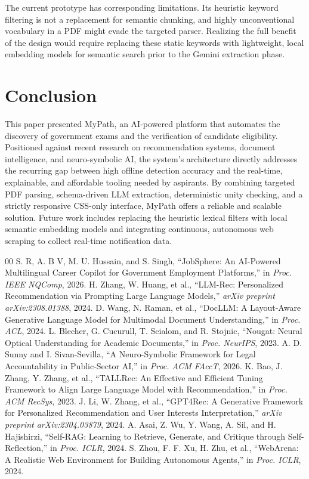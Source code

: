 \documentclass[conference]{IEEEtran}
\begin{document}
The current prototype has corresponding limitations. Its heuristic keyword filtering is not a replacement for semantic chunking, and highly unconventional vocabulary in a PDF might evade the targeted parser. Realizing the full benefit of the design would require replacing these static keywords with lightweight, local embedding models for semantic search prior to the Gemini extraction phase.

\section{Conclusion}

This paper presented MyPath, an AI-powered platform that automates the discovery of government exams and the verification of candidate eligibility. Positioned against recent research on recommendation systems, document intelligence, and neuro-symbolic AI, the system's architecture directly addresses the recurring gap between high offline detection accuracy and the real-time, explainable, and affordable tooling needed by aspirants. By combining targeted PDF parsing, schema-driven LLM extraction, deterministic unity checking, and a strictly responsive CSS-only interface, MyPath offers a reliable and scalable solution. Future work includes replacing the heuristic lexical filters with local semantic embedding models and integrating continuous, autonomous web scraping to collect real-time notification data.

\begin{thebibliography}{00}
 S. R, A. B V, M. U. Hussain, and S. Singh, ``JobSphere: An AI-Powered Multilingual Career Copilot for Government Employment Platforms,'' in \textit{Proc. IEEE NQComp}, 2026.
 H. Zhang, W. Huang, et al., ``LLM-Rec: Personalized Recommendation via Prompting Large Language Models,'' \textit{arXiv preprint arXiv:2308.01388}, 2024.
 D. Wang, N. Raman, et al., ``DocLLM: A Layout-Aware Generative Language Model for Multimodal Document Understanding,'' in \textit{Proc. ACL}, 2024.
 L. Blecher, G. Cucurull, T. Scialom, and R. Stojnic, ``Nougat: Neural Optical Understanding for Academic Documents,'' in \textit{Proc. NeurIPS}, 2023.
 A. D. Sunny and I. Sivan-Sevilla, ``A Neuro-Symbolic Framework for Legal Accountability in Public-Sector AI,'' in \textit{Proc. ACM FAccT}, 2026.
 K. Bao, J. Zhang, Y. Zhang, et al., ``TALLRec: An Effective and Efficient Tuning Framework to Align Large Language Model with Recommendation,'' in \textit{Proc. ACM RecSys}, 2023.
 J. Li, W. Zhang, et al., ``GPT4Rec: A Generative Framework for Personalized Recommendation and User Interests Interpretation,'' \textit{arXiv preprint arXiv:2304.03879}, 2024.
 A. Asai, Z. Wu, Y. Wang, A. Sil, and H. Hajishirzi, ``Self-RAG: Learning to Retrieve, Generate, and Critique through Self-Reflection,'' in \textit{Proc. ICLR}, 2024.
 S. Zhou, F. F. Xu, H. Zhu, et al., ``WebArena: A Realistic Web Environment for Building Autonomous Agents,'' in \textit{Proc. ICLR}, 2024.
\end{thebibliography}
\end{document}

